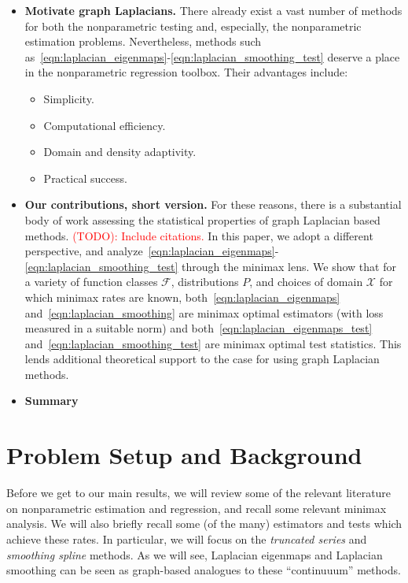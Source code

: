\documentclass{article}
\newcommand{\1}{\mathbf{1}}
\newcommand{\mc}[1]{\mathcal{#1}}
\theoremstyle{alden}
\theoremstyle{aldenthm}
\theoremstyle{definition}
\theoremstyle{remark}
\begin{document}
\begin{itemize}
	\item \textbf{Motivate graph Laplacians.} There already exist a vast number of methods for both the nonparametric testing and, especially, the nonparametric estimation problems. Nevertheless, methods such as~\eqref{eqn:laplacian_eigenmaps}-\eqref{eqn:laplacian_smoothing_test} deserve a place in the nonparametric regression toolbox. Their advantages include:
	\begin{itemize}
		\item Simplicity.
		\item Computational efficiency.
		\item Domain and density adaptivity.
		\item Practical success.
	\end{itemize}
	\item \textbf{Our contributions, short version.} For these reasons, there is a  substantial body of work assessing the statistical properties of graph Laplacian based methods. \textcolor{red}{(TODO): Include citations.} In this paper, we adopt a different perspective, and analyze~\eqref{eqn:laplacian_eigenmaps}-\eqref{eqn:laplacian_smoothing_test} through the minimax lens. We show that for a variety of function classes $\mc{F}$, distributions $P$, and choices of domain $\mc{X}$ for which minimax rates are known, both~\eqref{eqn:laplacian_eigenmaps} and~\eqref{eqn:laplacian_smoothing} are minimax optimal estimators (with loss measured in a suitable norm) and both~\eqref{eqn:laplacian_eigenmaps_test} and~\eqref{eqn:laplacian_smoothing_test} are minimax optimal test statistics. This lends additional theoretical support to the case for using graph Laplacian methods.
	\item \textbf{Summary}
\end{itemize}

\section{Problem Setup and Background}
\label{sec:problem_setup_and_background}

Before we get to our main results, we will review some of the relevant literature on nonparametric estimation and regression, and recall some relevant minimax analysis.  We will also briefly recall some (of the many) estimators and tests which achieve these rates. In particular, we will focus on the \emph{truncated series} and \emph{smoothing spline} methods. As we will see, Laplacian eigenmaps and Laplacian smoothing can be seen as graph-based analogues to these ``continuuum'' methods.
\end{document}
